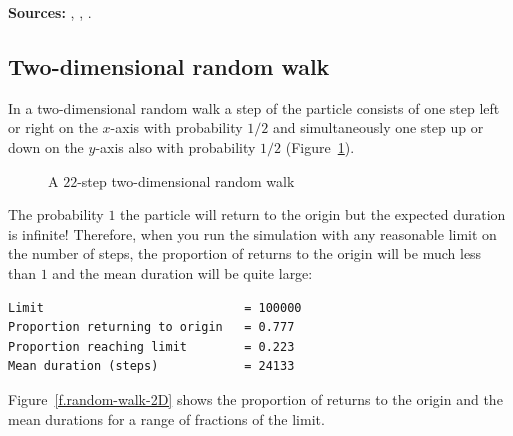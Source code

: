 \documentclass[11pt,a4paper]{article}
\begin{document}
\textbf{Sources:} \cite[Chapter 3]{privault}, \cite[Example 3.7.2]{BW}, \cite{border}.

\subsection{Two-dimensional random walk}

In a two-dimensional random walk a step of the particle consists of one step left or right on the $x$-axis with probability $1/2$ and simultaneously one step up or down on the $y$-axis also with probability $1/2$ (Figure~\ref{f.2d-random-walk}).

\begin{figure}
\begin{center}
\end{center}
\caption{A $22$-step two-dimensional random walk}\label{f.2d-random-walk}
\end{figure}
The probability $1$ the particle will return to the origin but the expected duration is infinite! Therefore, when you run the simulation with any reasonable limit on the number of steps, the proportion of returns to the origin will be much less than $1$ and the mean duration will be quite large:
\begin{verbatim}
Limit                            = 100000
Proportion returning to origin   = 0.777
Proportion reaching limit        = 0.223
Mean duration (steps)            = 24133
\end{verbatim}
Figure~\ref{f.random-walk-2D} shows the proportion of returns to the origin and the mean durations for a range of fractions of the limit.
\end{document}
